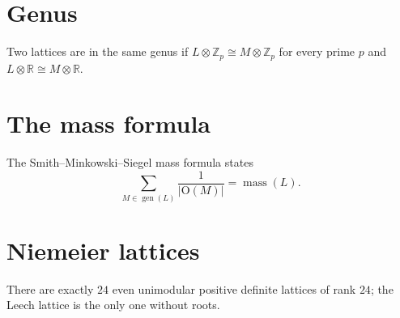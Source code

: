 \documentclass{article}
\begin{document}
\section{Genus}
Two lattices are in the same genus if $L \otimes \mathbb{Z}_p \cong M \otimes \mathbb{Z}_p$ for
every prime $p$ and $L \otimes \mathbb{R} \cong M \otimes \mathbb{R}$.
\newpage
\section{The mass formula}
The Smith--Minkowski--Siegel mass formula states
\[ \sum_{M \in \operatorname{gen}(L)} \frac{1}{|\mathrm{O}(M)|} = \operatorname{mass}(L). \]
\newpage
\section{Niemeier lattices}
There are exactly $24$ even unimodular positive definite lattices of rank $24$; the Leech
lattice is the only one without roots.
\end{document}
